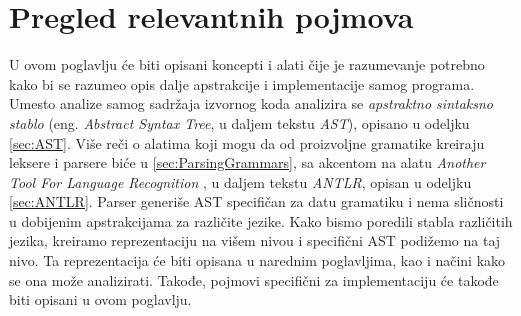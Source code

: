 \chapter{Pregled relevantnih pojmova}
\label{chp:RelevantTerms}

U ovom poglavlju će biti opisani koncepti i alati čije je razumevanje potrebno kako bi se razumeo opis dalje apstrakcije i implementacije samog programa. Umesto analize samog sadržaja izvornog koda analizira se \emph{apstraktno sintaksno stablo} (eng. \emph{Abstract Syntax Tree}, u daljem tekstu \emph{AST}), opisano u odeljku \ref{sec:AST}. Više reči o alatima koji mogu da od proizvoljne gramatike kreiraju leksere i parsere biće u \ref{sec:ParsingGrammars}, sa akcentom na alatu \emph{Another Tool For Language Recognition} \cite{ANTLR}, u daljem tekstu \emph{ANTLR}, opisan u odeljku \ref{sec:ANTLR}. Parser generiše AST specifičan za datu gramatiku i nema sličnosti u dobijenim apstrakcijama za različite jezike. Kako bismo poredili stabla različitih jezika, kreiramo reprezentaciju na višem nivou i specifični AST podižemo na taj nivo. Ta reprezentacija će biti opisana u narednim poglavljima, kao i načini kako se ona može analizirati. Takođe, pojmovi specifični za implementaciju će takođe biti opisani u ovom poglavlju.







